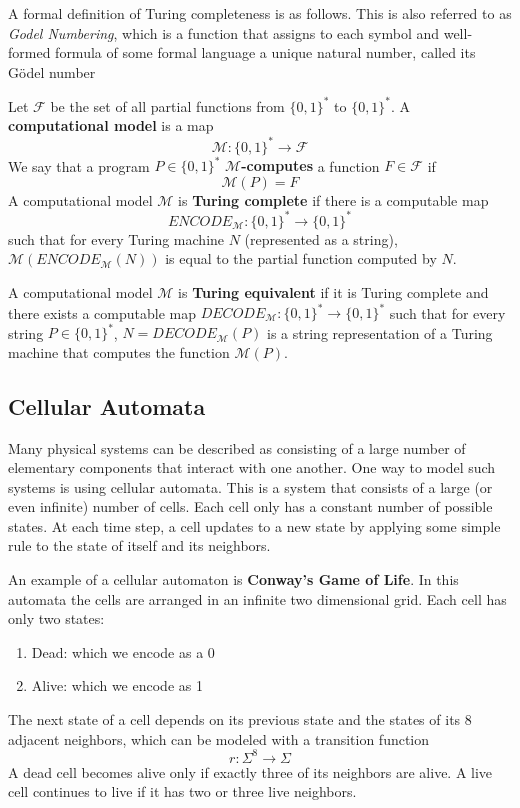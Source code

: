   A formal definition of Turing completeness is as follows. This is also referred to as \textit{Godel Numbering}, which is a function that assigns to each symbol and well-formed formula of some formal language a unique natural number, called its Gödel number 

  \begin{definition}
  Let $\mathcal{F}$ be the set of all partial functions from $\{0, 1\}^*$ to $\{0,1\}^*$. A \textbf{computational model} is a map
  \[\mathcal{M}: \{0,1\}^* \longrightarrow \mathcal{F}\]
  We say that a program $P \in \{0,1\}^*$ \textbf{$\mathcal{M}$-computes} a function $F \in \mathcal{F}$ if 
  \[\mathcal{M}(P) = F\]
  A computational model $\mathcal{M}$ is \textbf{Turing complete} if there is a computable map 
  \[ENCODE_{\mathcal{M}} : \{0,1\}^* \longrightarrow \{0,1\}^*\]
  such that for every Turing machine $N$ (represented as a string), $\mathcal{M}(ENCODE_\mathcal{M} (N))$ is equal to the partial function computed by $N$. 

  A computational model $\mathcal{M}$ is \textbf{Turing equivalent} if it is Turing complete and there exists a computable map $DECODE_\mathcal{M}: \{0,1\}^* \longrightarrow \{0,1\}^*$ such that for every string $P \in \{0,1\}^*$, $N = DECODE_\mathcal{M} (P)$ is a string representation of a Turing machine that computes the function $\mathcal{M}(P)$. 
  \end{definition} 

  \subsection{Cellular Automata}
  Many physical systems can be described as consisting of a large number of elementary components that interact with one another. One way to model such systems is using cellular automata. This is a system that consists of a large (or even infinite) number of cells. Each cell only has a constant number of possible states. At each time step, a cell updates to a new state by applying some simple rule to the state of itself and its neighbors.

  \begin{definition}
  An example of a cellular automaton is \textbf{Conway's Game of Life}. In this automata the cells are arranged in an infinite two dimensional grid. Each cell has only two states: 
  \begin{enumerate}
      \item Dead: which we encode as a 0
      \item Alive: which we encode as 1
  \end{enumerate}
  The next state of a cell depends on its previous state and the states of its 8 adjacent neighbors, which can be modeled with a transition function
  \[r: \Sigma^8 \longrightarrow \Sigma\]
  A dead cell becomes alive only if exactly three of its neighbors are alive. A live cell continues to live if it has two or three live neighbors. 
  \end{definition}

